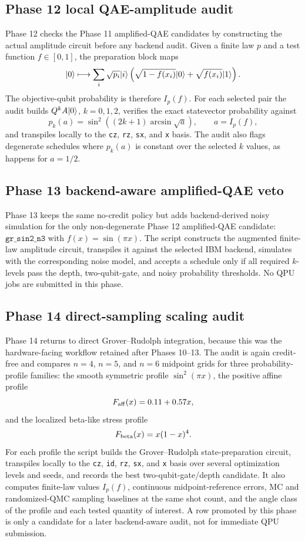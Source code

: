 \subsection{Phase 12 local QAE-amplitude audit}

Phase 12 checks the Phase 11 amplified-QAE candidates by constructing the
actual amplitude circuit before any backend audit. Given a finite law \(p\) and
a test function \(f\in[0,1]\), the preparation block maps
\[
  \lvert 0\rangle
  \longmapsto
  \sum_i \sqrt{p_i}\lvert i\rangle
  \left(\sqrt{1-f(x_i)}\lvert 0\rangle+\sqrt{f(x_i)}\lvert 1\rangle\right).
\]
The objective-qubit probability is therefore \(I_p(f)\). For each selected
pair the audit builds \(Q^kA\lvert 0\rangle\), \(k=0,1,2\), verifies the exact
statevector probability against
\[
  p_k(a)=\sin^2((2k+1)\arcsin\sqrt{a}),
  \qquad a=I_p(f),
\]
and transpiles locally to the \texttt{cz}, \texttt{rz}, \texttt{sx}, and
\texttt{x} basis. The audit also flags degenerate schedules where \(p_k(a)\) is
constant over the selected \(k\) values, as happens for \(a=1/2\).

\subsection{Phase 13 backend-aware amplified-QAE veto}

Phase 13 keeps the same no-credit policy but adds backend-derived noisy
simulation for the only non-degenerate Phase 12 amplified-QAE candidate:
\(\texttt{gr\_sin2\_n3}\) with \(f(x)=\sin(\pi x)\). The script constructs the
augmented finite-law amplitude circuit, transpiles it against the selected IBM
backend, simulates with the corresponding noise model, and accepts a schedule
only if all required \(k\)-levels pass the depth, two-qubit-gate, and noisy
probability thresholds. No QPU jobs are submitted in this phase.

\subsection{Phase 14 direct-sampling scaling audit}

Phase 14 returns to direct Grover--Rudolph integration, because this was the
hardware-facing workflow retained after Phases 10--13. The audit is again
credit-free and compares \(n=4\), \(n=5\), and \(n=6\) midpoint grids for three
probability-profile families: the smooth symmetric profile
\(\sin^2(\pi x)\), the positive affine profile
\[
  F_{\rm aff}(x)=0.11+0.57x,
\]
and the localized beta-like stress profile
\[
  F_{\rm beta}(x)=x(1-x)^4.
\]
For each profile the script builds the Grover--Rudolph state-preparation
circuit, transpiles locally to the \texttt{cz}, \texttt{id}, \texttt{rz},
\texttt{sx}, and \texttt{x} basis over several optimization levels and seeds,
and records the best two-qubit-gate/depth candidate. It also computes
finite-law values \(I_p(f)\), continuous midpoint-reference errors, MC and
randomized-QMC sampling baselines at the same shot count, and the angle class
of the profile and each tested quantity of interest. A row promoted by this
phase is only a candidate for a later backend-aware audit, not for immediate
QPU submission.

